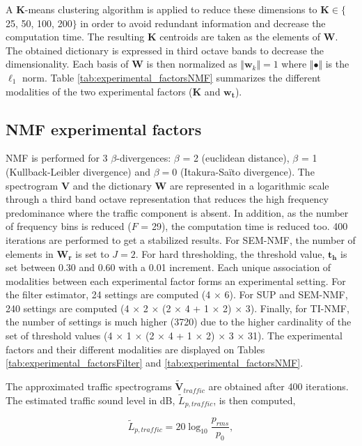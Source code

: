 \documentclass[review,5p,twocolumn,sort&compress,times]{elsarticle}
\begin{document}
A $\mathbf{K}$-means clustering algorithm is applied to reduce these dimensions to $\mathbf{K} \in \lbrace$25, 50, 100, 200$\rbrace$ in order to avoid redundant information and decrease the computation time. The resulting $\mathbf{K}$ centroids are taken as the elements of $\mathbf{W}$. 
The obtained dictionary is expressed in third octave bands to decrease the dimensionality. Each basis of $\mathbf{W}$ is then normalized as $ \Vert \mathbf{w}_k \Vert = 1$ where $\Vert \bullet \Vert$ is the $\ell_1$ norm. Table \ref{tab:experimental_factorsNMF} summarizes the different modalities of the two experimental factors ($\mathbf{K}$ and $\mathbf{w_t}$).

\subsection{NMF experimental factors}

NMF is performed for 3 $\beta$-divergences: $\beta$ = 2 (euclidean distance), $\beta$ = 1 (Kullback-Leibler divergence) and $\beta = 0$ (Itakura-Sa\"ito divergence). The spectrogram $\mathbf{V}$ and the dictionary $\mathbf{W}$ are represented in a logarithmic scale through a third band octave representation that reduces the high frequency predominance where the traffic component is absent. In addition, as the number of frequency bins is reduced ($F$ = 29), the computation time is reduced too. 400 iterations are performed to get a stabilized results. For SEM-NMF, the number of elements in $\mathbf{W_r}$ is set to $J = 2$. For hard thresholding, the threshold value, $\mathbf{t_h}$ is set between 0.30 and 0.60 with a 0.01 increment.
Each unique association of modalities between each experimental factor forms an experimental setting. For the filter estimator, 24 settings are computed (4 $\times$ 6). For SUP and SEM-NMF, 240 settings are computed (4 $\times$ 2 $\times$ (2 $\times$ 4 + 1 $\times$ 2) $\times$ 3). Finally, for TI-NMF, the number of settings is much higher (3720) due to the higher cardinality of the set of threshold values (4 $\times$ 1 $\times$ (2 $\times$ 4 + 1 $\times$ 2) $\times$ 3 $\times$ 31).
The experimental factors and their different modalities are displayed on Tables \ref{tab:experimental_factorsFilter} and \ref{tab:experimental_factorsNMF}.

The approximated traffic spectrograms $\mathbf{\tilde{V}}_{traffic}$ are obtained after 400 iterations. The estimated traffic sound level in dB, $\tilde{L}_{p, traffic}$, is then computed,

\begin{equation}
\tilde{L}_{p, traffic} = 20\log_{10}\frac{p_{rms}}{p_0},
\end{equation}
\end{document}

